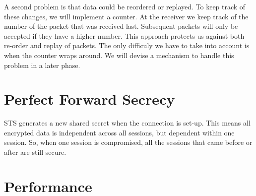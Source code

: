\documentclass[a4paper]{article}
\begin{document}
A second problem is that data could be reordered or replayed. To keep track of these changes, we will implement a counter. At the receiver we keep track of the number of the packet that was received last. Subsequent packets will only be accepted if they have a higher number. This approach protects us against both re-order and replay of packets. The only difficuly we have to take into account is when the counter wraps around. We will devise a mechanism to handle this problem in a later phase.

\section{Perfect Forward Secrecy}

STS generates a new shared secret when the connection is set-up. This means all encrypted data is independent across all sessions, but dependent within one session. So, when one session is compromised, all the sessions that came before or after are still secure.

\section{Performance}
\end{document}
